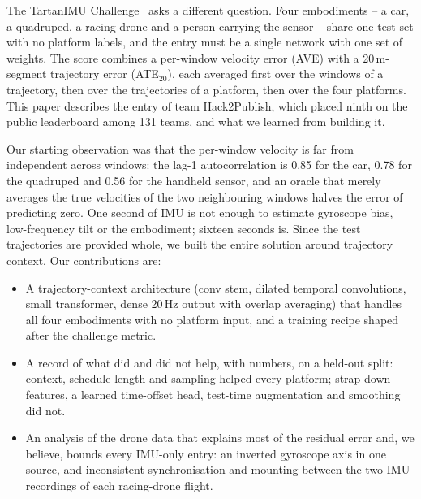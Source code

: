 \documentclass[letterpaper,10pt,conference]{ieeeconf}
\begin{document}
The TartanIMU Challenge~\cite{tartanimu} asks a different question. Four embodiments -- a car, a quadruped, a racing
drone and a person carrying the sensor -- share one test set with no platform labels, and the entry must be a
single network with one set of weights. The score combines a per-window velocity error (AVE) with a 20\,m-segment
trajectory error (ATE$_{20}$), each averaged first over the windows of a trajectory, then over the trajectories of a
platform, then over the four platforms. This paper describes the entry of team Hack2Publish, which placed ninth on
the public leaderboard among 131 teams, and what we learned from building it.

Our starting observation was that the per-window velocity is far from independent across windows: the lag-1
autocorrelation is 0.85 for the car, 0.78 for the quadruped and 0.56 for the handheld sensor, and an oracle that
merely averages the true velocities of the two neighbouring windows halves the error of predicting zero. One second
of IMU is not enough to estimate gyroscope bias, low-frequency tilt or the embodiment; sixteen seconds is. Since the
test trajectories are provided whole, we built the entire solution around trajectory context. Our contributions are:
\begin{itemize}
    \item A trajectory-context architecture (conv stem, dilated temporal convolutions, small transformer, dense
    20\,Hz output with overlap averaging) that handles all four embodiments with no platform input, and a training
    recipe shaped after the challenge metric.
    \item A record of what did and did not help, with numbers, on a held-out split: context, schedule length and
    sampling helped every platform; strap-down features, a learned time-offset head, test-time augmentation and
    smoothing did not.
    \item An analysis of the drone data that explains most of the residual error and, we believe, bounds every
    IMU-only entry: an inverted gyroscope axis in one source, and inconsistent synchronisation and mounting between
    the two IMU recordings of each racing-drone flight.
\end{itemize}
\end{document}
